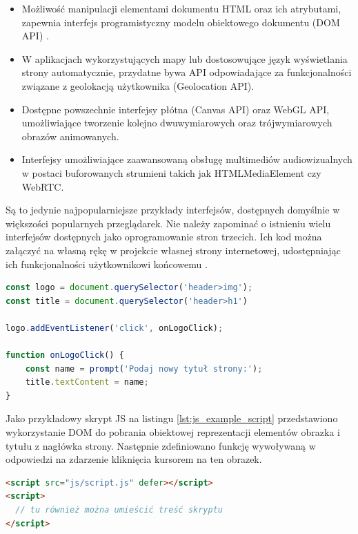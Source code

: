 \begin{itemize}
    \item Możliwość manipulacji elementami dokumentu HTML oraz ich atrybutami,  zapewnia interfejs programistyczny modelu obiektowego dokumentu (DOM API) \cite{js.dom}.
    \item W aplikacjach wykorzystujących mapy lub dostosowujące język wyświetlania strony automatycznie, przydatne bywa API odpowiadające za funkcjonalności związane z geolokacją użytkownika (Geolocation API). 
    \item Dostępne powszechnie interfejsy płótna (Canvas API) oraz WebGL API, umożliwiające tworzenie kolejno dwuwymiarowych oraz trójwymiarowych obrazów animowanych.
    \item Interfejsy umożliwiające zaawansowaną obsługę multimediów audiowizualnych w postaci buforowanych strumieni takich jak HTMLMediaElement czy WebRTC.
\end{itemize}

Są to jedynie najpopularniejsze przykłady interfejsów, dostępnych domyślnie w większości popularnych przeglądarek. Nie należy zapominać o istnieniu wielu interfejsów dostępnych jako oprogramowanie stron trzecich. Ich kod można załączyć na własną rękę w projekcie własnej strony internetowej, udostępniając ich funkcjonalności użytkownikowi końcowemu \cite{js.docs}.

\begin{lstlisting}[language=JavaScript, caption=Treść przykładowego skryptu JavaScript w pliku script.js, label=lst:js_example_script]
const logo = document.querySelector('header>img');
const title = document.querySelector('header>h1')

logo.addEventListener('click', onLogoClick);

function onLogoClick() {
    const name = prompt('Podaj nowy tytuł strony:');
    title.textContent = name;
}

\end{lstlisting}

Jako przykładowy skrypt JS na listingu \ref{lst:js_example_script} przedstawiono wykorzystanie DOM do pobrania obiektowej reprezentacji elementów obrazka i tytułu z nagłówka strony. Następnie zdefiniowano funkcję wywoływaną w odpowiedzi na zdarzenie kliknięcia kursorem na ten obrazek. 

\begin{lstlisting}[language=HTML, caption=Wykorzystanie skryptów JavaScript w pliku HTML, label=lst:js_in_html]
<script src="js/script.js" defer></script>
<script>
  // tu również można umieścić treść skryptu
</script>
\end{lstlisting}

